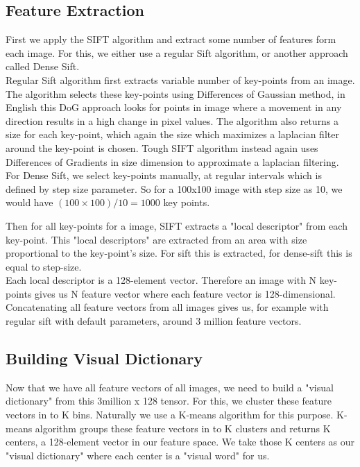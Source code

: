 \documentclass[conference,compsoc]{IEEEtran}
\begin{document}
\subsection{Feature Extraction}

First we apply the SIFT algorithm and extract some number of features form each image. For this, we either use a regular Sift algorithm, or another approach called Dense Sift. \\

Regular Sift algorithm first extracts variable number of key-points from an image. The algorithm selects these key-points using Differences of Gaussian method, in English this DoG approach looks for points in image where a movement in any direction results in a high change in pixel values. The algorithm also returns a size for each key-point, which again the size which maximizes a laplacian filter around the key-point is chosen. Tough SIFT algorithm instead again uses Differences of Gradients in size dimension to approximate a laplacian filtering.\\

For Dense Sift, we select key-points manually, at regular intervals which is defined by step size parameter. So for a 100x100 image with step size as 10, we would have $(100\times 100)/10 = 1000$ key points.

Then for all key-points for a image, SIFT extracts a "local descriptor" from each key-point. This "local descriptors" are extracted from an area with size proportional to the key-point's size. For sift this is extracted, for dense-sift this is equal to step-size.\\

Each local descriptor is a 128-element vector. Therefore an image with N key-points gives us N  feature vector where each feature vector is 128-dimensional. Concatenating all feature vectors from all images gives us, for example with regular sift with default parameters, around 3 million feature vectors.

\subsection{Building Visual Dictionary}

Now that we have all feature vectors of all images, we need to build a "visual dictionary" from this 3million x 128 tensor. For this, we cluster these feature vectors in to K bins. Naturally we use a K-means algorithm for this purpose. K-means algorithm groups these feature vectors in to K clusters and returns K centers, a 128-element vector in our feature space. We take those K centers as our "visual dictionary" where each center is a "visual word" for us.
\end{document}
